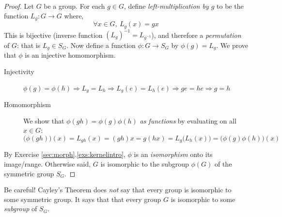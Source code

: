 \begin{proof}
	Let $G$ be a group. For each $g\in G$, define \emph{left-multiplication by $g$} to be the function $L_g:G\to G$ where,
	\[
		\forall x\in G,\ L_g(x)=gx
	\]
	This is bijective (inverse function $(L_g)^{-1}=L_{g^{-1}}$), and therefore a \emph{permutation} of $G$: that is $L_g\in S_G$.\smallbreak
	Now define a function $\phi:G\to S_G$ by $\phi(g)=L_g$. We prove that $\phi$ is an injective homomorphism.
	\begin{description}
		\item[Injectivity] $\phi(g)=\phi(h)\Longrightarrow L_g=L_h\Longrightarrow L_g(e)=L_h(e)\Longrightarrow ge=he\Longrightarrow g=h$
		\item[Homomorphism] We show that $\phi(gh)=\phi(g)\phi(h)$ \emph{as functions} by evaluating on all $x\in G$:
		\[
			\bigl(\phi(gh)\bigr)(x) =L_{gh}(x)=(gh)x=g(hx) =L_g\bigl(L_h(x)\bigr)=\bigl(\phi(g)\phi(h)\bigr)(x)
		\]
	\end{description}
	By Exercise \ref*{sec:morph}.\ref{exs:kernelintro}, $\phi$ is an \emph{isomorphism} onto its image/range. Otherwise said, $G$ is isomorphic to the subgroup $\phi(G)$ of the symmetric group $S_G$.
\end{proof}

Be careful! Cayley's Theorem does \emph{not} say that every group is isomorphic to some symmetric group. It says that that every group $G$ is isomorphic to some \emph{subgroup} of $S_G$.



